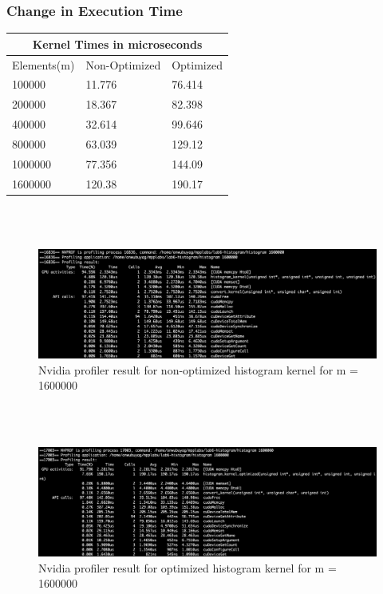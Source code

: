 \documentclass{article}
\begin{document}
\subsubsection{Change in Execution Time}
\setlength{\parindent}{1cm}
 \begin{tabular}{ |p{2cm}||p{3cm}|p{3cm}| }
 \hline
 \multicolumn{3}{|c|}{Kernel Times in microseconds}\\
 \hline
Elements(m) & Non-Optimized & Optimized\\
 \hline
 100000 & 11.776 & 76.414\\
 \hline
 200000 & 18.367 & 82.398\\
 \hline
 400000 & 32.614 & 99.646\\
 \hline
 800000 & 63.039 & 129.12\\
 \hline
 1000000 & 77.356 & 144.09\\
 \hline
 1600000 & 120.38 & 190.17\\
 \hline
 \end{tabular}
\\
\\
\begin{figure}[h]
\includegraphics[width=\textwidth]{nvprof_image_1.png}
\caption{Nvidia profiler result for non-optimized histogram kernel for m = 1600000}
\center
\end{figure}
 \\
\\
\begin{figure}[h]
\includegraphics[width=\textwidth]{nvprof_image_2.png}
\caption{Nvidia profiler result for optimized histogram kernel for m = 1600000}
\center
\end{figure}
\\
\\
\\
\\
\\
\end{document}
